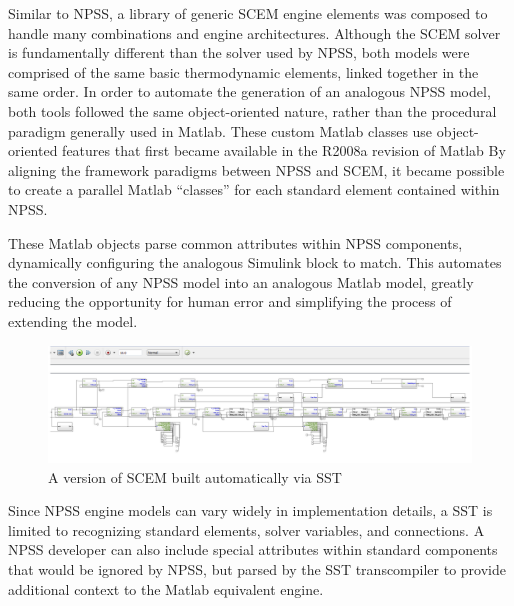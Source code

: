 \documentclass[heading.tex]{subfiles}
\begin{document}
Similar to NPSS, a library of generic SCEM engine elements was composed to handle many combinations and
engine architectures. Although the SCEM solver is fundamentally different than the solver used by NPSS,
both models were comprised of the same basic thermodynamic elements, linked together in the same order. 
In order to automate the generation of an analogous NPSS model,
both tools followed the same object-oriented nature, rather than the procedural paradigm generally used in Matlab. 
These custom Matlab classes use object-oriented features that first became
available in the R2008a revision of Matlab\cite{MatlabOOP}
By aligning the framework paradigms between NPSS and SCEM,
it became possible to create a parallel Matlab ``classes'' for each standard element contained within NPSS.

These Matlab objects parse common attributes within NPSS components,
dynamically configuring the analogous Simulink block to match.
This automates the conversion of any NPSS model into an analogous Matlab model,
greatly reducing the opportunity for human error and simplifying the process of extending the model.

\begin{figure}[H]
\centering
 \begin{adjustwidth}{-3cm}{-2cm}
\includegraphics[width=1.4\textwidth]{images/VCE5screencap}
\end{adjustwidth} 
\caption{A version of SCEM built automatically via SST}
\label{f:sstSCEM}

\end{figure}

Since NPSS engine models can vary widely in implementation details, a SST is limited to recognizing
standard elements, solver variables, and connections.
A NPSS developer can also include special attributes within standard components that would be
ignored by NPSS, but parsed by the SST transcompiler to provide additional context to the
Matlab equivalent engine.

\begin{adjustwidth}{-0.5cm}{-0.5cm}
 \inputminted[]{c++}{code/parser}
 \end{adjustwidth} 
\end{document}
